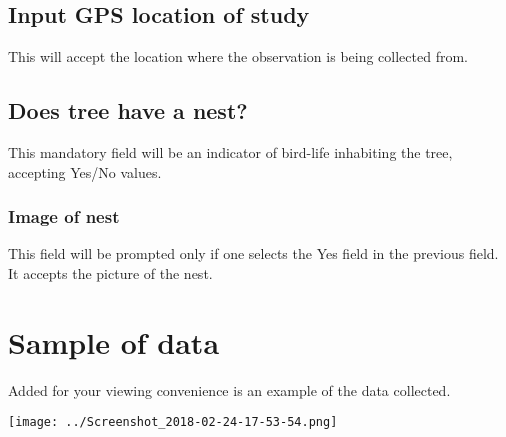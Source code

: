 \documentclass[10pt,a4paper]{article}
\begin{document}
\subsection {Input GPS location of study}
This will accept the location where the observation is being collected from.

\subsection {Does tree have a nest?}
This mandatory field will be an indicator of bird-life inhabiting the tree, accepting Yes/No values.

\subsubsection {Image of nest}
This field will be prompted only if one selects the Yes field in the previous field. It accepts the picture of the  nest.


\section{Sample of data}
Added for your viewing convenience is an example of the data collected.
\begin{flushleft}
\texttt{[image: ../Screenshot\_2018-02-24-17-53-54.png]}
\end{flushleft}
  
\end{document}
